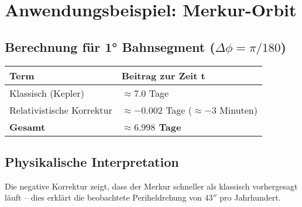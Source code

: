 \section{Anwendungsbeispiel: Merkur-Orbit}
\subsection{Berechnung für 1° Bahnsegment ($\Delta\phi = \pi/180$)}
\begin{table}[h]
\centering
\begin{tabular}{|l|l|}
\hline
\textbf{Term} & \textbf{Beitrag zur Zeit t} \\ \hline
Klassisch (Kepler) & $\approx 7.0$ Tage \\ \hline
Relativistische Korrektur & $\approx -0.002$ Tage ($\approx -3$ Minuten) \\ \hline
\textbf{Gesamt} & \textbf{$\approx 6.998$ Tage} \\ \hline
\end{tabular}
\end{table}

\subsection{Physikalische Interpretation}
Die negative Korrektur zeigt, dass der Merkur schneller als klassisch vorhergesagt läuft -- dies erklärt die beobachtete Periheldrehung von $43''$ pro Jahrhundert.
